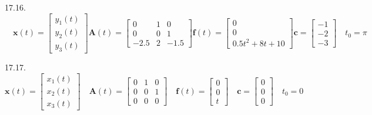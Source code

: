 \documentclass[10pt]{article}
\begin{document}
17.16. $\quad \mathbf{x}(t)=\left[\begin{array}{l}y_{1}(t) \\ y_{2}(t) \\ y_{3}(t)\end{array}\right] \mathbf{A}(t)=\left[\begin{array}{ccc}0 & 1 & 0 \\ 0 & 0 & 1 \\ -2.5 & 2 & -1.5\end{array}\right] \mathbf{f}(t)=\left[\begin{array}{c}0 \\ 0 \\ 0.5 t^{2}+8 t+10\end{array}\right] \mathbf{c}=\left[\begin{array}{l}-1 \\ -2 \\ -3\end{array}\right] \quad t_{0}=\pi$

17.17. $\mathbf{x}(t)=\left[\begin{array}{l}x_{1}(t) \\ x_{2}(t) \\ x_{3}(t)\end{array}\right] \quad \mathbf{A}(t)=\left[\begin{array}{lll}0 & 1 & 0 \\ 0 & 0 & 1 \\ 0 & 0 & 0\end{array}\right] \quad \mathbf{f}(t)=\left[\begin{array}{l}0 \\ 0 \\ t\end{array}\right] \quad \mathbf{c}=\left[\begin{array}{l}0 \\ 0 \\ 0\end{array}\right] \quad t_{0}=0$
\end{document}
